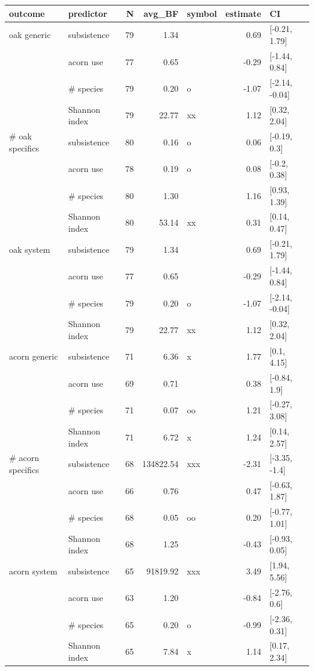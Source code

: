 \begin{table}[ht]
\centering
\begin{tabular}{llrrlrl}
  \hline
outcome & predictor & N & avg_BF & symbol & estimate & CI \\ 
  \hline
oak generic & subsistence & 79 & 1.34 &  & 0.69 & [-0.21, 1.79] \\ 
   & acorn use & 77 & 0.65 &  & -0.29 & [-1.44, 0.84] \\ 
   & # species & 79 & 0.20 & o & -1.07 & [-2.14, -0.04] \\ 
   & Shannon index & 79 & 22.77 & xx & 1.12 & [0.32, 2.04] \\ 
  # oak specifics & subsistence & 80 & 0.16 & o & 0.06 & [-0.19, 0.3] \\ 
   & acorn use & 78 & 0.19 & o & 0.08 & [-0.2, 0.38] \\ 
   & # species & 80 & 1.30 &  & 1.16 & [0.93, 1.39] \\ 
   & Shannon index & 80 & 53.14 & xx & 0.31 & [0.14, 0.47] \\ 
  oak system & subsistence & 79 & 1.34 &  & 0.69 & [-0.21, 1.79] \\ 
   & acorn use & 77 & 0.65 &  & -0.29 & [-1.44, 0.84] \\ 
   & # species & 79 & 0.20 & o & -1.07 & [-2.14, -0.04] \\ 
   & Shannon index & 79 & 22.77 & xx & 1.12 & [0.32, 2.04] \\ 
  acorn generic & subsistence & 71 & 6.36 & x & 1.77 & [0.1, 4.15] \\ 
   & acorn use & 69 & 0.71 &  & 0.38 & [-0.84, 1.9] \\ 
   & # species & 71 & 0.07 & oo & 1.21 & [-0.27, 3.08] \\ 
   & Shannon index & 71 & 6.72 & x & 1.24 & [0.14, 2.57] \\ 
  # acorn specifics & subsistence & 68 & 134822.54 & xxx & -2.31 & [-3.35, -1.4] \\ 
   & acorn use & 66 & 0.76 &  & 0.47 & [-0.63, 1.87] \\ 
   & # species & 68 & 0.05 & oo & 0.20 & [-0.77, 1.01] \\ 
   & Shannon index & 68 & 1.25 &  & -0.43 & [-0.93, 0.05] \\ 
  acorn system & subsistence & 65 & 91819.92 & xxx & 3.49 & [1.94, 5.56] \\ 
   & acorn use & 63 & 1.20 &  & -0.84 & [-2.76, 0.6] \\ 
   & # species & 65 & 0.20 & o & -0.99 & [-2.36, 0.31] \\ 
   & Shannon index & 65 & 7.84 & x & 1.14 & [0.17, 2.34] \\ 
   \hline
\end{tabular}
\end{table}
